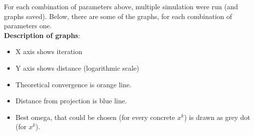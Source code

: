 \documentclass[11pt]{book}
\begin{document}
For each combination of parameters above, multiple simulation were run (and graphs saved). Below, there are some of the graphs, for each combination of parameters one.\\

\newpage
\textbf{Description of graphs}:
\begin{itemize}[noitemsep]
	\item X axis shows iteration
	\item Y axis shows distance (logarithmic scale)
	\item Theoretical convergence is orange line.
	\item Distance from projection is blue line.
	\item Best omega, that could be chosen (for every concrete $x^k$) is drawn as grey dot (for $x^k$).
\end{itemize}
\end{document}
